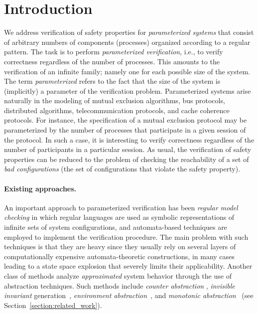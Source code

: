 \section{Introduction}
\label{section:introduction} 

%
We address verification of safety properties
for {\it parameterized systems} that
consist of arbitrary numbers
of components (processes)  organized
according to a regular pattern.
%
%
The task is to perform \emph{parameterized verification}, i.e., to
verify correctness regardless of the number of processes.
%
%
This amounts to the verification of an infinite family;
namely one for each possible size of the system.
%
The term {\it parameterized} refers to the fact that the size
of the system is (implicitly) a parameter of the verification problem.
%
Parameterized systems arise naturally in the modeling of mutual
exclusion algorithms, bus protocols, distributed algorithms,
telecommunication protocols, and cache coherence protocols.
%
For instance, the specification of a mutual exclusion protocol may be 
parameterized by the number of processes that
participate in  a given session of the protocol.
%
In such a case, it is interesting to verify 
correctness regardless of the number of participants in a particular session.
%
As usual, the verification of safety properties can be
reduced
to the problem of checking the reachability of a set of {\it bad
configurations} (the set of configurations that violate the safety property).

\paragraph{Existing approaches.}
%
An important approach to parameterized verification has been
{\it regular model checking}
\cite{KMMPS2001,AJNO:simple,BLW03} in which
regular languages are used
as symbolic representations of infinite sets of 
system configurations, and automata-based techniques are employed to implement the verification
procedure.
%
The main problem with such techniques is that  they
are heavy since they usually rely on several layers of computationally
expensive automata-theoretic constructions, in many cases
leading to a state space explosion that
severely limits their applicability.
%
Another class of methods analyze {\it approximated} system
behavior through the use of abstraction techniques.
%
Such methods include  {\it counter abstraction}
\cite{GerSis:many,PXZ02},
 {\em invisible invariant} generation~\cite{APRXZ01,PRZ-tacas01},
{\em environment abstraction}~\cite{CTV06}, and
 {\it monotonic  abstraction}~\cite{rmc:wo:transducers}
(see Section~\ref{section:related_work}).


